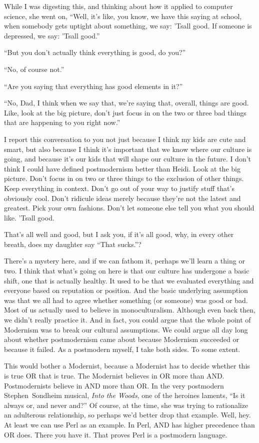 While I was digesting this, and thinking about how it applied to computer
science, she went on, ``Well, it's like, you know, we have this saying at
school, when somebody gets uptight about something, we say: 'Tsall good. If
someone is depressed, we say: 'Tsall good.''

``But you don't actually think everything is good, do you?''

``No, of course not.''

``Are you saying that everything has good elements in it?''

``No, Dad, I think when we say that, we're saying that, overall, things are
good. Like, look at the big picture, don't just focus in on the two or three
bad things that are happening to you right now.''

I report this conversation to you not just because I think my kids are cute
and smart, but also because I think it's important that we know where our
culture is going, and because it's our kids that will shape our culture in
the future. I don't think I could have defined postmodernism better than
Heidi. Look at the big picture. Don't focus in on two or three things to the
exclusion of other things. Keep everything in context. Don't go out of your
way to justify stuff that's obviously cool. Don't ridicule ideas merely
because they're not the latest and greatest. Pick your own fashions. Don't
let someone else tell you what you should like. 'Tsall good.

That's all well and good, but I ask you, if it's all good, why, in every
other breath, does my daughter say ``That sucks.''?

There's a mystery here, and if we can fathom it, perhaps we'll learn a thing
or two. I think that what's going on here is that our culture has undergone a
basic shift, one that is actually healthy. It used to be that we evaluated
everything and everyone based on reputation or position. And the basic
underlying assumption was that we all had to agree whether something (or
someone) was good or bad. Most of us actually used to believe in
monoculturalism. Although even back then, we didn't really practice it. And
in fact, you could argue that the whole point of Modernism was to break our
cultural assumptions. We could argue all day long about whether postmodernism
came about because Modernism succeeded or because it failed. As a postmodern
myself, I take both sides. To some extent.

This would bother a Modernist, because a Modernist has to decide whether this
is true OR that is true. The Modernist believes in OR more than AND.
Postmodernists believe in AND more than OR. In the very postmodern Stephen~Sondheim
musical, {\it Into the Woods},
one of the heroines laments, ``Is it
always or, and never and?'' Of course, at the time, she was trying to
rationalize an adulterous relationship, so perhaps we'd better drop that
example. Well, hey. At least we can use Perl as an example. In Perl, AND has
higher precedence than OR does. There you have it. That proves Perl is a
postmodern language.

